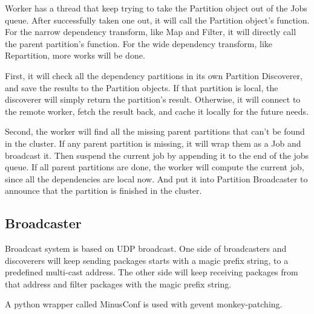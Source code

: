 Worker has a thread that keep trying to take the Partition object out of the Jobs queue.
After successfully taken one out, it will call the Partition object's function.
For the narrow dependency transform, like Map and Filter, it will directly call the parent partition's function.
For the wide dependency transform, like Repartition, more works will be done.

First, it will check all the dependency partitions in its own Partition Discoverer,
and save the results to the Partition objects.
If that partition is local, the discoverer will simply return the partition's result.
Otherwise, it will connect to the remote worker, fetch the result back, and cache it locally for the future needs.

Second, the worker will find all the missing parent partitions that can't be found in the cluster.
If any parent partition is missing, it will wrap them as a Job and broadcast it.
Then suspend the current job by appending it to the end of the jobs queue.
If all parent partitions are done, the worker will compute the current job, since all the dependencies are local now.
And put it into Partition Broadcaster to announce that the partition is finished in the cluster.

\subsection{Broadcaster} %
\label{sub:broadcaster}
Broadcast system is based on UDP broadcast.
One side of broadcasters and discoverers will keep sending packages starts with a magic prefix string,
to a predefined multi-cast address.
The other side will keep receiving packages from that address and filter packages with the magic prefix string.

A python wrapper called MinusConf\cite{minusconf} is used with gevent monkey-patching.

